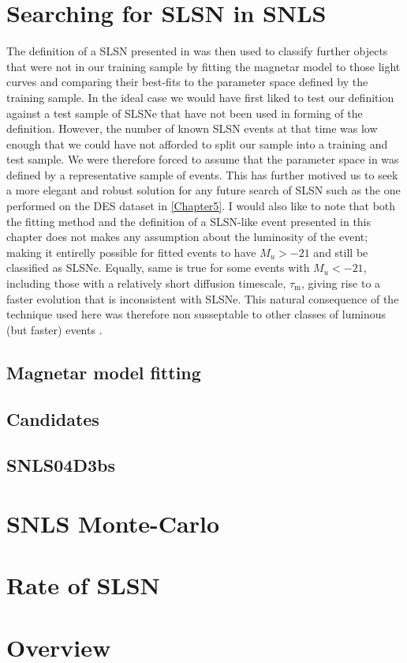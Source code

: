 \section{Searching for SLSN in SNLS}
The definition of a SLSN presented in  was then used to classify further objects that were not in our training sample by fitting the magnetar model to those light curves and comparing their best-fits to the parameter space defined by the training sample. In the ideal case we would have first liked to test our definition against a test sample of SLSNe that have not been used in forming of the definition. However, the number of known SLSN events at that time was low enough that we could have not afforded to split our sample into a training and test sample. We were therefore forced to assume that the parameter space in  was defined by a representative sample of events. This has further motived us to seek a more elegant and robust solution for any future search of SLSN such as the one performed on the DES dataset in \cref{Chapter5}. I would also like to note that both the fitting method and the definition of a SLSN-like event presented in this chapter does not makes any assumption about the luminosity of the event; making it entirelly possible for fitted events to have $M_u>-21$ and still be classified as SLSNe. Equally, same is true for some events with $M_u<-21$, including those with a relatively short diffusion timescale, $\tau_\mathrm{m}$, giving rise to a faster evolution that is inconsistent with SLSNe. This natural consequence of the technique used here was therefore non susseptable to other classes of luminous (but faster) events \citep{Arcavi15}.

\subsection{Magnetar model fitting}
\subsection{Candidates}
\subsection{SNLS04D3bs}

\section{SNLS Monte-Carlo}

\section{Rate of SLSN}

\section{Overview}

